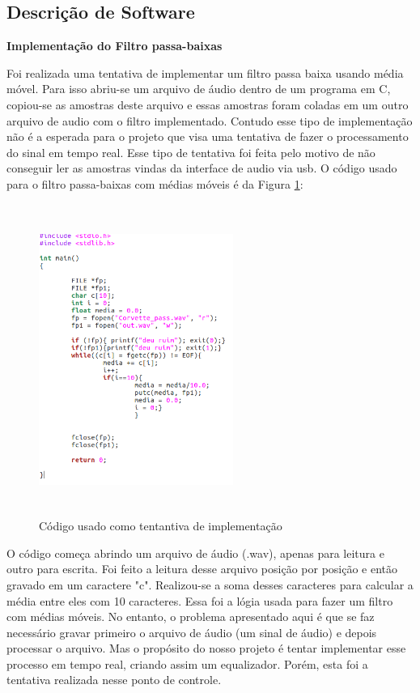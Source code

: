 \documentclass[conference]{IEEEtran}
\begin{document}
\subsection{Descrição de Software}

\begin{flushleft}

\textbf{Implementação do Filtro passa-baixas}
\end{flushleft}
 
Foi realizada uma tentativa de implementar um filtro passa baixa usando média móvel. Para isso abriu-se um arquivo de áudio dentro de um programa em C, copiou-se as amostras deste arquivo e essas amostras foram coladas em um outro arquivo de audio com o filtro implementado. 
Contudo esse tipo de implementação não é a esperada para o projeto que visa uma tentativa de fazer o processamento do sinal em tempo real. Esse tipo de tentativa foi feita pelo motivo de não conseguir ler as amostras vindas da  interface de audio via usb. O código usado para o filtro passa-baixas com médias móveis é da Figura \ref{codigo}:

\begin{figure}[!htb]
\centering
\includegraphics[width=2.5in, height=4in]{Imagens/vai}
\caption{Código usado como tentantiva de implementação} 
\label{codigo}
\end{figure}

O código começa abrindo um arquivo de áudio (.wav), apenas para leitura e outro para escrita. Foi feito a leitura desse arquivo posição por posição e então gravado em um caractere "c". Realizou-se a soma desses caracteres para calcular a média entre eles com 10 caracteres. 
Essa foi a lógia usada para fazer um filtro com médias móveis. No entanto, o problema apresentado aqui é que se faz necessário gravar primeiro o arquivo de áudio (um sinal de áudio) e depois processar o arquivo. Mas o propósito do nosso projeto é tentar implementar esse processo em tempo real, criando assim um equalizador. Porém, esta foi a tentativa realizada nesse ponto de controle.
\\





\end{document}
